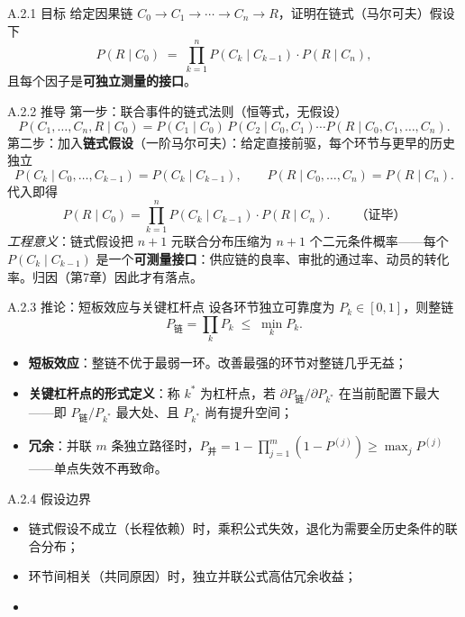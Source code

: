 \documentclass[../../main2.tex]{subfiles}
\begin{document}

	\begin{mathbox}{A.2.1 目标}
		给定因果链 $C_0 \to C_1 \to \cdots \to C_n \to R$，证明在链式（马尔可夫）假设下
		\[ P(R \mid C_0) \;=\; \prod_{k=1}^{n} P(C_k \mid C_{k-1}) \cdot P(R \mid C_n), \]
		且每个因子是\textbf{可独立测量的接口}。
	\end{mathbox}

	\begin{mathbox}{A.2.2 推导}
		第一步：联合事件的链式法则（恒等式，无假设）
		\[ P(C_1, \dots, C_n, R \mid C_0) = P(C_1 \mid C_0)\, P(C_2 \mid C_0, C_1) \cdots P(R \mid C_0, C_1, \dots, C_n). \]
		第二步：加入\textbf{链式假设}（一阶马尔可夫）：给定直接前驱，每个环节与更早的历史独立
		\[ P(C_k \mid C_0, \dots, C_{k-1}) = P(C_k \mid C_{k-1}), \qquad P(R \mid C_0, \dots, C_n) = P(R \mid C_n). \]
		代入即得
		\[ P(R \mid C_0) = \prod_{k=1}^{n} P(C_k \mid C_{k-1}) \cdot P(R \mid C_n). \qquad \text{（证毕）} \]
		\textit{工程意义}：链式假设把 $n{+}1$ 元联合分布压缩为 $n{+}1$ 个二元条件概率——每个 $P(C_k \mid C_{k-1})$ 是一个\textbf{可测量接口}：供应链的良率、审批的通过率、动员的转化率。归因（第7章）因此才有落点。
	\end{mathbox}

	\begin{mathbox}{A.2.3 推论：短板效应与关键杠杆点}
		设各环节独立可靠度为 $P_k \in [0,1]$，则整链
		\[ P_{\text{链}} = \prod_{k} P_k \;\le\; \min_k P_k. \]
		\begin{itemize}
			\item \textbf{短板效应}：整链不优于最弱一环。改善最强的环节对整链几乎无益；
			\item \textbf{关键杠杆点的形式定义}：称 $k^\ast$ 为杠杆点，若 $\partial P_{\text{链}} / \partial P_{k^\ast}$ 在当前配置下最大——即 $P_{\text{链}} / P_{k^\ast}$ 最大处、且 $P_{k^\ast}$ 尚有提升空间；
			\item \textbf{冗余}：并联 $m$ 条独立路径时，$P_{\text{并}} = 1 - \prod_{j=1}^{m}(1 - P^{(j)}) \ge \max_j P^{(j)}$——单点失效不再致命。
		\end{itemize}
	\end{mathbox}

	\begin{mathbox}{A.2.4 假设边界}
		\begin{itemize}
			\item 链式假设不成立（长程依赖）时，乘积公式失效，退化为需要全历史条件的联合分布；
			\item 环节间相关（共同原因）时，独立并联公式高估冗余收益；
			\item {}
		\end{itemize}
	\end{mathbox}
\end{document}
